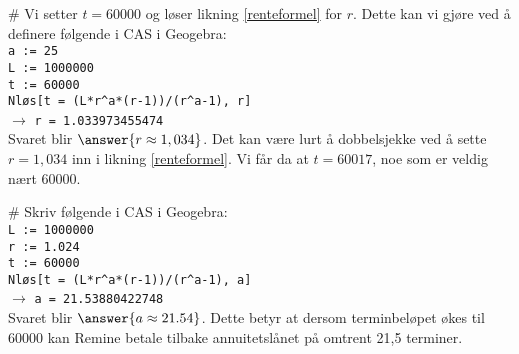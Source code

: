 \begin{easylist}[enumerate]
	# Vi setter $t = 60000$ og løser likning \eqref{renteformel} for $r$.
	Dette kan vi gjøre ved å definere følgende i CAS i Geogebra: \\
	\texttt{a  := 25} \\
	\texttt{L := 1000000} \\
	\texttt{t := 60000} \\
	\texttt{Nløs[t = (L*r\textasciicircum a*(r-1))/(r\textasciicircum a-1), r]} \\
	$\rightarrow$ \texttt{r = 1.033973455474} \\
	Svaret blir $\answer{r \approx 1,034}$.
	Det kan være lurt å dobbelsjekke ved å sette $r = 1,034$ inn i likning \eqref{renteformel}. Vi får da at $t = 60017$, noe som er veldig nært 60000.
	
	# Skriv følgende i CAS i Geogebra: \\
	\texttt{L := 1000000} \\
	\texttt{r := 1.024} \\
	\texttt{t := 60000} \\
	\texttt{Nløs[t = (L*r\textasciicircum a*(r-1))/(r\textasciicircum a-1), a]} \\
	$\rightarrow$ \texttt{a = 21.53880422748} \\
	Svaret blir $\answer{a \approx 21.54}$. Dette betyr at dersom terminbeløpet økes til 60000 kan Remine betale tilbake annuitetslånet på omtrent 21,5 terminer.
\end{easylist}






